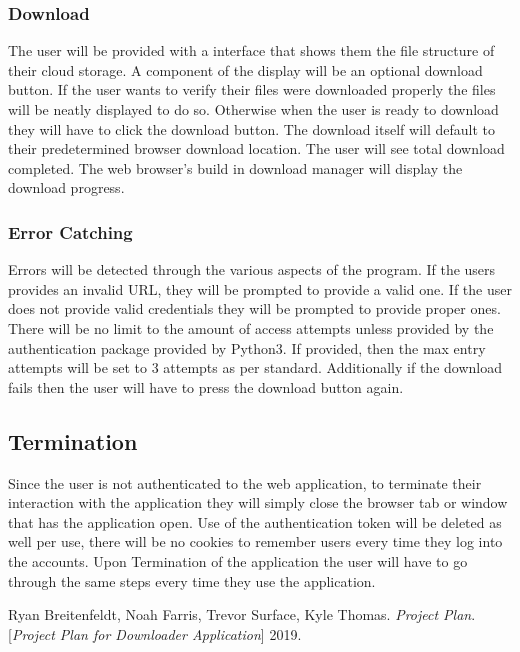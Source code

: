 \documentclass{article}
\begin{document}
            \subsubsection{Download}
            The user will be provided with a interface that shows them the file structure of their cloud storage. A component of the display will be an optional download button. If the user wants to verify
            their files were downloaded properly the files will be neatly displayed to do so. Otherwise when the user is ready to download they will have to click the download button. The download itself 
            will default to their predetermined browser download location. The user will see total download completed. The web browser's build in download manager will display the download progress.

            \subsubsection{Error Catching}
            Errors will be detected through the various aspects of the program. If the users provides an invalid URL, they will be prompted to provide a valid one. If the user does not provide valid credentials
            they will be prompted to provide proper ones. There will be no limit to the amount of access attempts unless provided by the authentication package provided by Python3. If provided, then the max entry
            attempts will be set to 3 attempts as per standard. Additionally if the download fails then the user will have to press the download button again.

        \subsection{Termination}
        Since the user is not authenticated to the web application, to terminate their interaction with the application they will simply close the browser tab or window that has the
        application open. Use of the authentication token will be deleted as well per use, there will be no cookies to remember users every time they log into the accounts. Upon Termination
        of the application the user will have to go through the same steps every time they use the application.


        \newpage
        \begin{thebibliography}{1}
        Ryan Breitenfeldt, Noah Farris, Trevor Surface, Kyle Thomas.
        \textit{Project Plan}.
        [\textit{Project Plan for Downloader Application}] 2019.
        \end{thebibliography}



\end{document}
